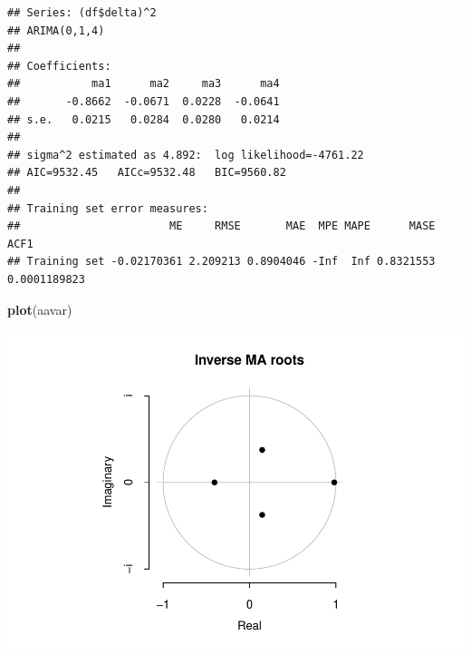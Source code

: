 \documentclass[11pt, a4paper]{report}
\newenvironment{Shaded}{\begin{snugshade}}{\end{snugshade}}
\newcommand{\KeywordTok}[1]{\textcolor[rgb]{0.13,0.29,0.53}{\textbf{#1}}}
\newcommand{\NormalTok}[1]{#1}
\newcommand{\OperatorTok}[1]{\textcolor[rgb]{0.81,0.36,0.00}{\textbf{#1}}}
\theoremstyle{plain}
\theoremstyle{plain}
\theoremstyle{remark}
\begin{document}
\begin{verbatim}
## Series: (df$delta)^2 
## ARIMA(0,1,4) 
## 
## Coefficients:
##           ma1      ma2     ma3      ma4
##       -0.8662  -0.0671  0.0228  -0.0641
## s.e.   0.0215   0.0284  0.0280   0.0214
## 
## sigma^2 estimated as 4.892:  log likelihood=-4761.22
## AIC=9532.45   AICc=9532.48   BIC=9560.82
## 
## Training set error measures:
##                       ME     RMSE       MAE  MPE MAPE      MASE         ACF1
## Training set -0.02170361 2.209213 0.8904046 -Inf  Inf 0.8321553 0.0001189823
\end{verbatim}

\begin{Shaded}
\begin{Highlighting}[]
\KeywordTok{plot}\NormalTok{(aavar)}
\end{Highlighting}
\end{Shaded}

\begin{center}\includegraphics{Econo2_P1_files/figure-latex/auto arima-5} \end{center}

\begin{Shaded}
\end{Shaded}
\end{document}
